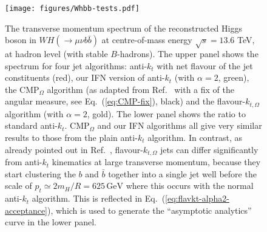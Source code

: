 \documentclass[nofootinbib,twocolumn,preprintnumbers,superscriptaddress,aps]{revtex4-2}
\newcommand{\GeV}{\,\text{GeV}}
\begin{document}
\begin{figure}
  \centering
  \texttt{[image: figures/Whbb-tests.pdf]}
  \caption{
    The transverse momentum spectrum of the reconstructed Higgs boson in $WH(\to
    \mu\nu b\bar b)$ at centre-of-mass energy $\sqrt{s}=13.6$ TeV, at hadron level
    (with stable $B$-hadrons).
    The upper panel shows the spectrum for four jet algorithms: anti-$k_t$
    with net flavour of the jet constituents (red), our
    IFN version of anti-$k_t$ (with $\alpha=2$, green), the CMP$_\Omega$
    algorithm (as adapted from Ref.~\cite{Czakon:2022wam} with a fix 
    of the angular measure, see Eq.~(\ref{eq:CMP-fix}), black) and the
    flavour-$k_{t,\Omega}$ algorithm (with $\alpha=2$, gold).
    The lower panel shows the ratio to standard anti-$k_t$. 
    CMP$_\Omega$ and our IFN algorithms all give very similar results to those
    from the plain anti-$k_t$ algorithm.
    In contrast, as already pointed out in
    Ref.~\cite{Behring:2020uzq}, flavour-$k_{t,\Omega}$ 
    jets can differ significantly from anti-$k_t$ kinematics at large
    transverse momentum, because they start clustering the $b$ and
    $\bar b$ together into a single jet well before the scale of $p_t \simeq 2m_H/R =
    625\GeV$ where this occurs with the normal anti-$k_t$ algorithm.
    This is reflected in Eq.~(\ref{eq:flavkt-alpha2-acceptance}), which
    is used to generate the ``asymptotic analytics'' curve in the
    lower panel.
  }
  \label{fig:WHbb-tests}
\end{figure}
\end{document}
